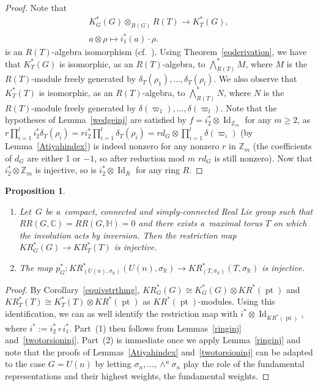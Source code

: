 \documentclass[pdftex]{sigma}
\numberwithin{equation}{section}
\newtheorem{Proposition}[Theorem]{Proposition}
{\theoremstyle{definition}
\newtheorem{Definition}[Theorem]{Definition}
\newtheorem{Example}[Theorem]{Example}
\newtheorem{Remark}[Theorem]{Remark}
}
\DeclareMathOperator{\pt}{pt}
\DeclareMathOperator{\Id}{Id}
\begin{document}
\begin{proof}
Note that
\begin{gather*}
K_G^*(G)\otimes_{R(G)}R(T)  \to  K_T^*(G),
\\
a\otimes\rho  \mapsto  i_1^*(a)\cdot\rho.
\end{gather*}
is an $R(T)$-algebra isomorphism (cf.~\cite[Theorem~4.4]{HLS}).
Using Theorem~\ref{eqderivation}, we have that $K_T^*(G)$ is isomorphic, as an $R(T)$-algebra, to $\bigwedge_{R(T)}^*M$,
where $M$ is the $R(T)$-module freely generated by $\delta_T(\rho_1), \dots, \delta_T(\rho_l)$.
We also observe that $K_T^*(T)$ is isomorphic, as an $R(T)$-algebra, to $\bigwedge_{R(T)}^*N$, where $N$ is the
$R(T)$-module freely generated by $\delta(\varpi_1), \dots, \delta(\varpi_l)$.
Note that the hypotheses of Lemma~\ref{wedgeinj} are satisf\/ied by $f=i_2^*\otimes\Id_{\mathbb{Z}_m}$ for any
$m\geq 2$, as
$r\prod\limits_{i=1}^li_2^*\delta_T(\rho_i)=ri_2^*\prod\limits_{i=1}^l\delta_T(\rho_i)=rd_G\otimes\prod\limits_{i=1}^l\delta(\varpi_i)$
(by Lemma~\ref{Atiyahindex}) is indeed nonzero for any nonzero $r$ in $\mathbb{Z}_m$ (the coef\/f\/icients of $d_G$ are
either 1 or $-1$, so after reduction mod $m$ $rd_G$ is still nonzero).
Now that $i_2^*\otimes\mathbb{Z}_m$ is injective, so is $i_2^*\otimes\Id_R$ for any ring $R$.
\end{proof}

\begin{Proposition}\label{pginjective}{\samepage\quad
\begin{enumerate}\itemsep=0pt
\item[$1.$]
Let~$G$ be a~compact, connected and simply-connected Real Lie group such that $RR(G, \mathbb{C})=RR(G, \mathbb{H})=0$
and there exists a~maximal torus $T$ on which the involution acts by inversion.
Then the restriction map
$KR_{G}^*(G)\to KR_T^*(T)$
is injective.
\item[$2.$]
The map $p_G^*: KR_{(U(n),
\sigma_\mathbb{R})}^*(U(n),
\sigma_\mathbb{R})\to KR_{(T,
\sigma_\mathbb{R})}^*(T,
\sigma_\mathbb{R})$ is injective.
\end{enumerate}}
\end{Proposition}

\begin{proof}
By Corollary~\ref{equivstrthmg}, $KR^*_G(G)\cong K^*_G(G)\otimes KR^*(\pt)$ and $KR_T^*(T)\cong K^*_T(T)\otimes
KR^*(\pt)$ as $KR^*(\pt)$-modules.
Using this identif\/ication, we can as well identify the restriction map with $i^*\otimes\Id_{KR^*(\pt)}$,
where $i^*:=i_2^*\circ i_1^*$.
Part~(1) then follows from Lemmas~\ref{ringinj} and~\ref{twotorsioninj}.
Part~(2) is immediate once we apply Lemma~\ref{ringinj} and note that the proofs of Lemmas~\ref{Atiyahindex}
and~\ref{twotorsioninj} can be adapted to the case $G=U(n)$ by letting $\sigma_n, \dots, \wedge^n\sigma_n$
play the role of the fundamental representations and their highest weights, the
fundamental weights.
\end{proof}
\end{document}

